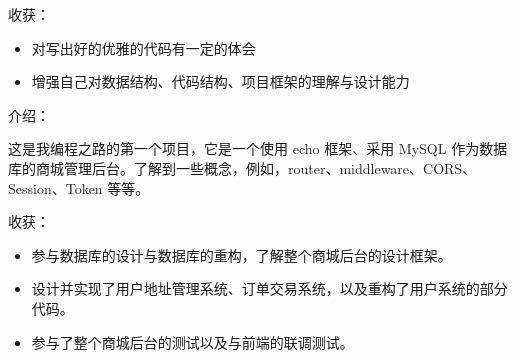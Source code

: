 \documentclass{resume}
\begin{document}
\vspace{1mm}\par
\noindent

收获：
\begin{itemize}[parsep=1ex]
	\item 对写出好的优雅的代码有一定的体会
	\item 增强自己对数据结构、代码结构、项目框架的理解与设计能力
\end{itemize}


\vspace{1mm} \par
\noindent
介绍：

\vspace{1mm}\par
\setlength{\parindent}{2ex}
这是我编程之路的第一个项目，它是一个使用 echo 框架、采用 MySQL 作为数据库的商城管理后台。了解到一些概念，例如，router、middleware、CORS、Session、Token 等等。

\vspace{1mm}\par
\noindent
收获：

\begin{itemize}[parsep=1ex]
	\item 参与数据库的设计与数据库的重构，了解整个商城后台的设计框架。
	\item 设计并实现了用户地址管理系统、订单交易系统，以及重构了用户系统的部分代码。
	\item 参与了整个商城后台的测试以及与前端的联调测试。
\end{itemize} \vspace{1mm}
\end{document}
